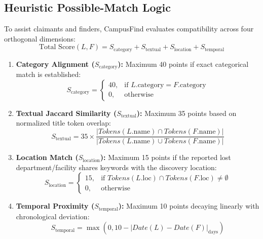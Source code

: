 \documentclass[11pt,a4paper]{article}
\begin{document}
\subsection{Heuristic Possible-Match Logic}
To assist claimants and finders, CampusFind evaluates compatibility across four orthogonal dimensions:
\begin{equation}
\text{Total Score}(L, F) = S_{\text{category}} + S_{\text{textual}} + S_{\text{location}} + S_{\text{temporal}}
\end{equation}

\begin{enumerate}
    \item \textbf{Category Alignment ($S_{\text{category}}$):} Maximum 40 points if exact categorical match is established:
    \begin{equation}
    S_{\text{category}} = \begin{cases} 40, & \text{if } L.\text{category} = F.\text{category} \\ 0, & \text{otherwise} \end{cases}
    \end{equation}
    \item \textbf{Textual Jaccard Similarity ($S_{\text{textual}}$):} Maximum 35 points based on normalized title token overlap:
    \begin{equation}
    S_{\text{textual}} = 35 \times \frac{|Tokens(L.\text{name}) \cap Tokens(F.\text{name})|}{|Tokens(L.\text{name}) \cup Tokens(F.\text{name})|}
    \end{equation}
    \item \textbf{Location Match ($S_{\text{location}}$):} Maximum 15 points if the reported lost department/facility shares keywords with the discovery location:
    \begin{equation}
    S_{\text{location}} = \begin{cases} 15, & \text{if } Tokens(L.\text{loc}) \cap Tokens(F.\text{loc}) \neq \emptyset \\ 0, & \text{otherwise} \end{cases}
    \end{equation}
    \item \textbf{Temporal Proximity ($S_{\text{temporal}}$):} Maximum 10 points decaying linearly with chronological deviation:
    \begin{equation}
    S_{\text{temporal}} = \max\left(0, 10 - |Date(L) - Date(F)|_{\text{days}}\right)
    \end{equation}
\end{enumerate}
\end{document}

